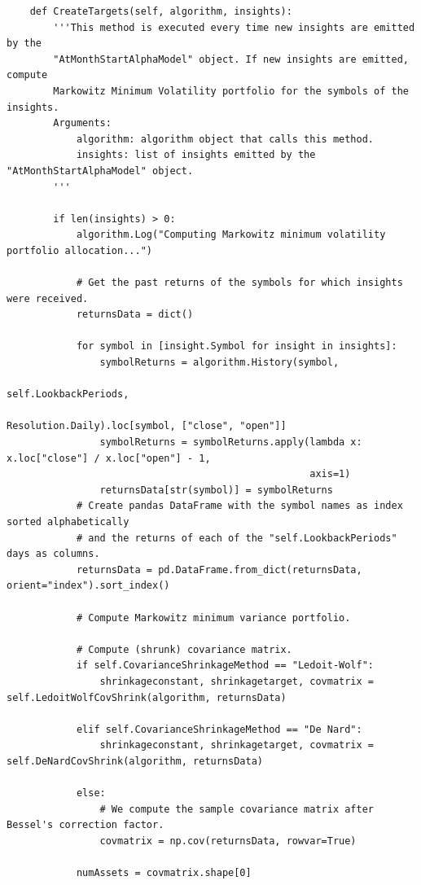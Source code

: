 \begin{verbatim}
    def CreateTargets(self, algorithm, insights):
        '''This method is executed every time new insights are emitted by the
        "AtMonthStartAlphaModel" object. If new insights are emitted, compute
        Markowitz Minimum Volatility portfolio for the symbols of the insights.
        Arguments:
            algorithm: algorithm object that calls this method.
            insights: list of insights emitted by the "AtMonthStartAlphaModel" object.
        '''
        
        if len(insights) > 0:
            algorithm.Log("Computing Markowitz minimum volatility portfolio allocation...")
            
            # Get the past returns of the symbols for which insights were received.
            returnsData = dict()
        
            for symbol in [insight.Symbol for insight in insights]:
                symbolReturns = algorithm.History(symbol,
                                                  self.LookbackPeriods,
                                                  Resolution.Daily).loc[symbol, ["close", "open"]]
                symbolReturns = symbolReturns.apply(lambda x: x.loc["close"] / x.loc["open"] - 1,
                                                    axis=1)
                returnsData[str(symbol)] = symbolReturns
            # Create pandas DataFrame with the symbol names as index sorted alphabetically
            # and the returns of each of the "self.LookbackPeriods" days as columns.
            returnsData = pd.DataFrame.from_dict(returnsData, orient="index").sort_index()
            
            # Compute Markowitz minimum variance portfolio.
            
            # Compute (shrunk) covariance matrix.
            if self.CovarianceShrinkageMethod == "Ledoit-Wolf":
                shrinkageconstant, shrinkagetarget, covmatrix = self.LedoitWolfCovShrink(algorithm, returnsData)
                
            elif self.CovarianceShrinkageMethod == "De Nard":
                shrinkageconstant, shrinkagetarget, covmatrix = self.DeNardCovShrink(algorithm, returnsData)
                
            else:
                # We compute the sample covariance matrix after Bessel's correction factor.
                covmatrix = np.cov(returnsData, rowvar=True)
            
            numAssets = covmatrix.shape[0]
            

\end{verbatim}
